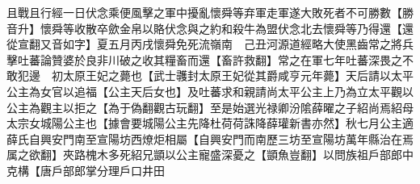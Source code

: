 且戰且行經一日伏念乘便風擊之軍中擾亂懷舜等弃軍走軍遂大敗死者不可勝數【勝音升】懷舜等收散卒歛金帛以賂伏念與之約和殺牛為盟伏念北去懷舜等乃得還【還從宣翻又音如字】夏五月丙戌懷舜免死流嶺南　己丑河源道經略大使黑齒常之將兵擊吐蕃論贊婆於良非川破之收其糧畜而還【畜許救翻】常之在軍七年吐蕃深畏之不敢犯邊　初太原王妃之薨也【武士彠封太原王妃從其爵咸亨元年薨】天后請以太平公主為女官以追福【公主天后女也】及吐蕃求和親請尚太平公主上乃為立太平觀以公主為觀主以拒之【為于偽翻觀古玩翻】至是始選光禄卿汾隂薛曜之子紹尚焉紹母太宗女城陽公主也【據會要城陽公主先降杜荷荷誅降薛瓘新書亦然】秋七月公主適薛氏自興安門南至宣陽坊西燎炬相屬【自興安門而南歷三坊至宣陽坊萬年縣治在焉属之欲翻】夾路槐木多死紹兄顗以公主寵盛深憂之【顗魚豈翻】以問族祖戶部郎中克構【唐戶部郎掌分理戶口井田